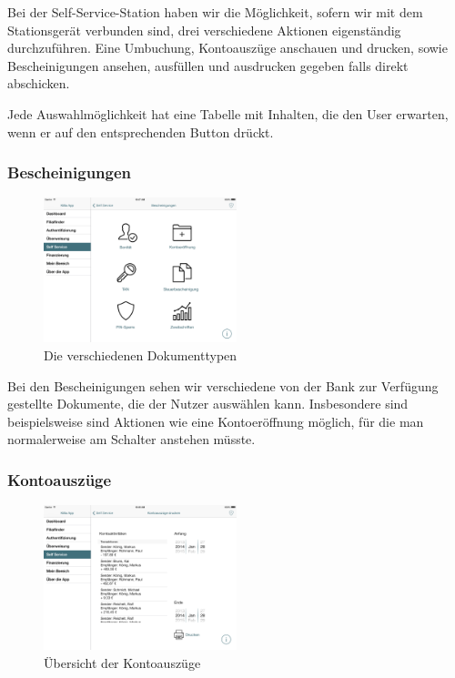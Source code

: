 \noindent	Bei der Self-Service-Station haben wir die Möglichkeit, sofern wir mit dem Stationsgerät verbunden sind, drei verschiedene Aktionen eigenständig durchzuführen. Eine Umbuchung, Kontoauszüge anschauen und drucken, sowie Bescheinigungen ansehen, ausfüllen und ausdrucken gegeben falls direkt abschicken.

	Jede Auswahlmöglichkeit hat eine Tabelle mit Inhalten, die den User erwarten, wenn er auf den entsprechenden Button drückt.

\subsubsection{Bescheinigungen}
\begin{figure}[h]
	\centering
  \includegraphics[width=0.5\textwidth]{Pictures/Bescheinigungen}
	\caption{Die verschiedenen Dokumenttypen}
	\label{fig6}
\end{figure}

	Bei den Bescheinigungen sehen wir verschiedene von der Bank zur Verfügung gestellte Dokumente, die der Nutzer auswählen kann. Insbesondere sind beispielsweise sind Aktionen wie eine Kontoeröffnung möglich, für die man normalerweise am Schalter anstehen müsste.

\subsubsection{Kontoauszüge}
\begin{figure}[h]
	\centering
  \includegraphics[width=0.5\textwidth]{Pictures/kontoauszuege}
	\caption{Übersicht der Kontoauszüge}
	\label{fig7}
\end{figure}

